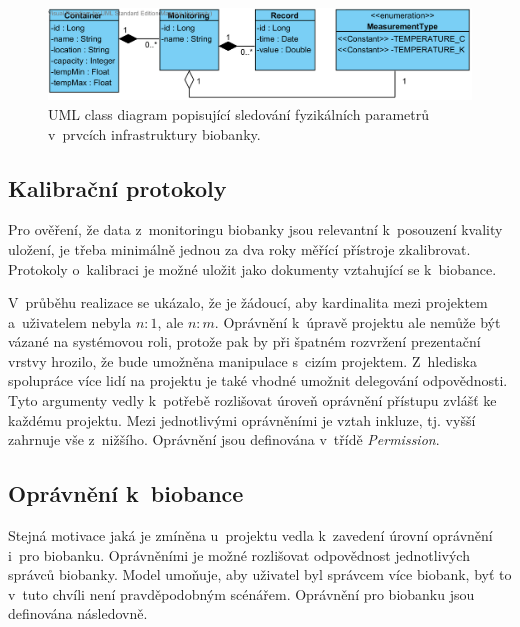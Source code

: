 \documentclass[11pt, draft, oneside]{fithesis2}
\begin{document}
\begin{figure}[h!]
\begin{center}
	\includegraphics[width=\textwidth]{MonitoringView}
\caption{UML class diagram popisující sledování fyzikálních parametrů v~prvcích infrastruktury biobanky.}
\label{fig:index:uml:class:monitoring}
\end{center}
\end{figure}


\subsection{Kalibrační protokoly}
Pro ověření, že data z~monitoringu biobanky jsou relevantní k~posouzení kvality uložení, je třeba minimálně jednou za dva roky měřící přístroje zkalibrovat. Protokoly o~kalibraci je možné uložit jako dokumenty vztahující se k~biobance.


V~průběhu realizace se ukázalo, že je žádoucí, aby kardinalita mezi projektem a~uživatelem nebyla $n:1$, ale $n:m$. Oprávnění k~úpravě projektu ale nemůže být vázané na systémovou roli, protože pak by při špatném rozvržení prezentační vrstvy hrozilo, že bude umožněna manipulace s~cizím projektem. Z~hlediska spolupráce více lidí na projektu je také vhodné umožnit delegování odpovědnosti. Tyto argumenty vedly k~potřebě rozlišovat úroveň oprávnění přístupu zvlášť ke každému projektu.
Mezi jednotlivými oprávněními je vztah inkluze, tj. vyšší zahrnuje vše z~nižšího. Oprávnění jsou definována v~třídě \textit{Permission}.

  
\subsection{Oprávnění k~biobance}\label{chapter:proposal:subsection:biobankPermission}
Stejná motivace jaká je zmíněna u~projektu vedla k~zavedení úrovní oprávnění i~pro biobanku. Oprávněními je možné rozlišovat odpovědnost jednotlivých správců biobanky. Model umoňuje, aby uživatel byl správcem více biobank, byť to v~tuto chvíli není pravděpodobným scénářem.
Oprávnění pro biobanku jsou definována následovně.
\end{document}
